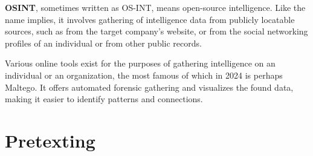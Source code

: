 \textbf{OSINT}, sometimes written as OS-INT, means open-source intelligence. Like the name implies, it involves gathering of intelligence data from publicly locatable sources, such as from the target company's website, or from the social networking profiles of an individual or from other public records.


Various online tools exist for the purposes of gathering intelligence on an individual or an organization, the most famous of which in 2024 is perhaps Maltego. It offers automated forensic gathering and visualizes the found data, making it easier to identify patterns and connections.




\section{Pretexting}
\begin{comment}

    - General info about what is pretexting
    - Fabricated scenario that is plausible but fraudulent
    - Originally used by FBI
    - Impersonation
    - Discussion about how modern AI can aid with pretexting is in the final chapter
    - Role in the deception-based SE attacks
    - Common pretexting tactics will be covered later
    - How AI powers up pretexting will be discussed later
        - How AI tech can be utilized to create more sophisticated and convincing pretexts
        - Examples of succesful pretexting attacks and their impacts
        - AI and automated pretexting attacks and their effectiveness
        - Analysis on pretexting evolving landscape with AI
    - Ethical considerations?
    - Countermeasures will be covered later also
        - How to identify and mitigate attempts
        - Recommendations for organiations to enhance their defenses against pretexting attacks
        
\end{comment}

